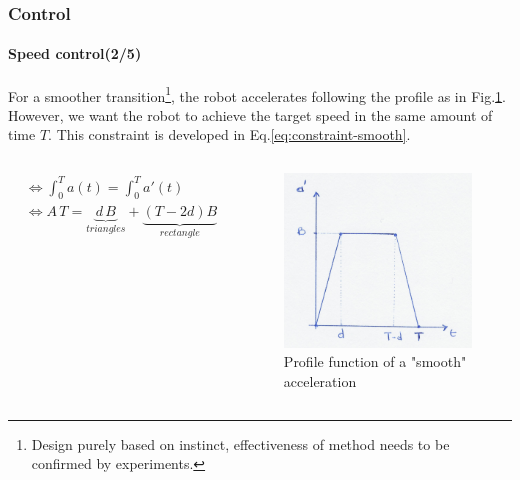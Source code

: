 \documentclass[10pt]{beamer}
\begin{document}
\begin{frame}
\frametitle{Control}
\framesubtitle{Speed control(2/5)}
For a smoother transition\footnote{Design purely based on instinct, effectiveness of method needs to be confirmed by experiments.}, the robot accelerates following the profile as in Fig.\ref{fig:smooth-acc}. However, we want the robot to achieve the target speed in the same amount of time $T$. This constraint is developed in Eq.\ref{eq:constraint-smooth}.
\begin{columns}[c]

\begin{equation}\label{eq:constraint-smooth}
\begin{aligned}
&\Leftrightarrow \int_{0}^{T}a(t) =  \int_{0}^{T}a'(t) \\
&\Leftrightarrow A\,T = \underbrace{d\,B}_{triangles} + \underbrace{(T - 2d)B}_{rectangle}
\end{aligned}
\end{equation}

\begin{figure}[hbtp]
\centering
\includegraphics[scale=0.07]{figures/smooth-acc}
\caption{Profile function of a "smooth" acceleration}
\label{fig:smooth-acc}
\end{figure}
\end{columns}
\end{frame}
\end{document}

